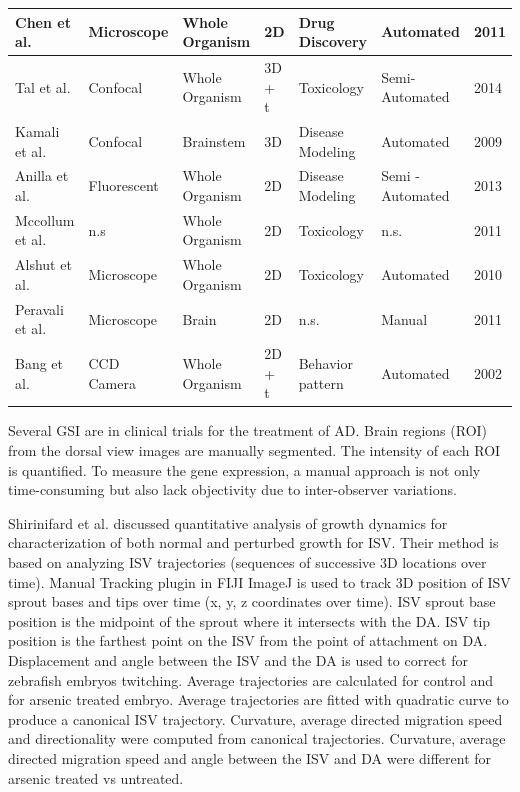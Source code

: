 \begin{landscape}
\begin{table}
{\begin{tabular}{| l | l | l | l | l | l | l |}
		Chen et al. & Microscope & Whole Organism & 2D & Drug Discovery & Automated & 2011 \\ \hline
		
		Tal et al. & Confocal & Whole Organism & 3D + t & Toxicology & Semi-Automated & 2014 \\ \hline
		
		Kamali et al. & Confocal & Brainstem & 3D & Disease Modeling & Automated & 2009 \\ \hline
		
		Anilla et al. & Fluorescent & Whole Organism & 2D & Disease Modeling & Semi - Automated & 2013 \\ \hline
		
		Mccollum et al. & n.s & Whole Organism & 2D & Toxicology & n.s. & 2011 \\ \hline
		
		Alshut et al. & Microscope & Whole Organism & 2D & Toxicology & Automated & 2010 \\ \hline
		
		Peravali et al. & Microscope & Brain & 2D & n.s. & Manual & 2011 \\ \hline
		
		Bang et al. & CCD Camera & Whole Organism & 2D + t & Behavior pattern & Automated & 2002 \\
		
\hline %
\end{tabular}
\label{table:reviewPast}
}
\end{table}
\end{landscape}

Several GSI are in clinical trials for the treatment of AD. Brain regions (ROI) from the dorsal view images are manually segmented. The intensity of each ROI is quantified. To measure the gene expression, a manual approach is not only time-consuming but also lack objectivity due to inter-observer variations.

Shirinifard et al. \cite{Shirinifard13} discussed quantitative analysis of growth dynamics for characterization of both normal and perturbed growth for ISV. Their method is based on analyzing ISV trajectories (sequences of successive 3D locations over time). Manual Tracking plugin in FIJI ImageJ is used to track 3D position of ISV sprout bases and tips over time (x, y, z coordinates over time). ISV sprout base position is the midpoint of the sprout where it intersects with the DA. ISV tip position is the farthest point on the ISV from the point of attachment on DA. Displacement and angle between the ISV and the DA is used to correct for zebrafish embryos twitching. Average trajectories are calculated for control and for arsenic treated embryo. Average trajectories are fitted with quadratic curve to produce a canonical ISV trajectory.  Curvature, average directed migration speed and directionality were computed from canonical trajectories. Curvature, average directed migration speed and angle between the ISV and DA were different for arsenic treated vs untreated.

